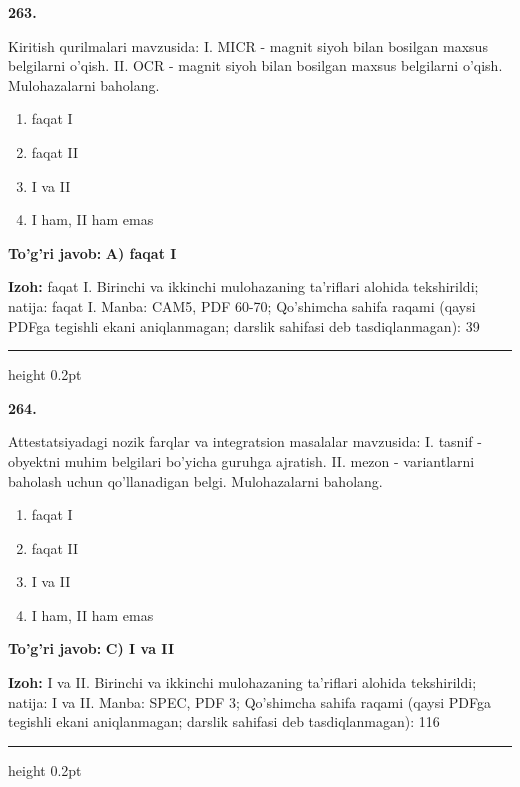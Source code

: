 \documentclass[10pt,a4paper]{article}
\begin{document}
{\bfseries\sffamily\color{ink} 263.}
\par
Kiritish qurilmalari mavzusida: I. MICR - magnit siyoh bilan bosilgan maxsus belgilarni o'qish. II. OCR - magnit siyoh bilan bosilgan maxsus belgilarni o'qish. Mulohazalarni baholang.
\begin{enumerate}[label=\Alph*),leftmargin=9mm]
\item faqat I
\item faqat II
\item I va II
\item I ham, II ham emas
\end{enumerate}
\begin{tcolorbox}[enhanced,breakable,colback=teal!4,colframe=teal!60!black,boxrule=0.45pt,arc=1.2mm,left=2.7mm,right=2.7mm,top=1.8mm,bottom=1.8mm,before skip=2mm,after skip=2mm]
{\bfseries\sffamily\color{teal}To'g'ri javob:} \textbf{A) faqat I}
\par\smallskip
{\bfseries Izoh:} faqat I. Birinchi va ikkinchi mulohazaning ta'riflari alohida tekshirildi; natija: faqat I. Manba: CAM5, PDF 60-70; Qo'shimcha sahifa raqami (qaysi PDFga tegishli ekani aniqlanmagan; darslik sahifasi deb tasdiqlanmagan): 39
\end{tcolorbox}
\vspace{2mm}\hrule height 0.2pt\vspace{3mm}

{\bfseries\sffamily\color{ink} 264.}
\par
Attestatsiyadagi nozik farqlar va integratsion masalalar mavzusida: I. tasnif - obyektni muhim belgilari bo'yicha guruhga ajratish. II. mezon - variantlarni baholash uchun qo'llanadigan belgi. Mulohazalarni baholang.
\begin{enumerate}[label=\Alph*),leftmargin=9mm]
\item faqat I
\item faqat II
\item I va II
\item I ham, II ham emas
\end{enumerate}
\begin{tcolorbox}[enhanced,breakable,colback=teal!4,colframe=teal!60!black,boxrule=0.45pt,arc=1.2mm,left=2.7mm,right=2.7mm,top=1.8mm,bottom=1.8mm,before skip=2mm,after skip=2mm]
{\bfseries\sffamily\color{teal}To'g'ri javob:} \textbf{C) I va II}
\par\smallskip
{\bfseries Izoh:} I va II. Birinchi va ikkinchi mulohazaning ta'riflari alohida tekshirildi; natija: I va II. Manba: SPEC, PDF 3; Qo'shimcha sahifa raqami (qaysi PDFga tegishli ekani aniqlanmagan; darslik sahifasi deb tasdiqlanmagan): 116
\end{tcolorbox}
\vspace{2mm}\hrule height 0.2pt\vspace{3mm}
\end{document}
